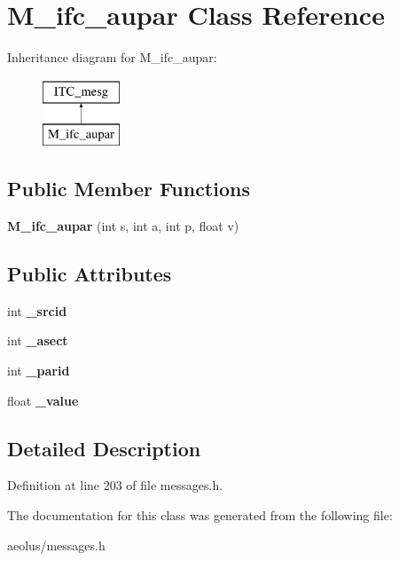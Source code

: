 \hypertarget{class_m__ifc__aupar}{}\section{M\+\_\+ifc\+\_\+aupar Class Reference}
\label{class_m__ifc__aupar}
Inheritance diagram for M\+\_\+ifc\+\_\+aupar\+:\begin{figure}[H]
\begin{center}
\leavevmode
\includegraphics[height=2.000000cm]{class_m__ifc__aupar}
\end{center}
\end{figure}
\subsection*{Public Member Functions}
\begin{DoxyCompactItemize}
\item 
\mbox{\label{class_m__ifc__aupar_a8bdf56df27f1d9e9916a562db3147278}} 
{\bfseries M\+\_\+ifc\+\_\+aupar} (int s, int a, int p, float v)
\end{DoxyCompactItemize}
\subsection*{Public Attributes}
\begin{DoxyCompactItemize}
\item 
\mbox{\label{class_m__ifc__aupar_a7a3bec9bad6c81938f8d30cda5d72027}} 
int {\bfseries \+\_\+srcid}
\item 
\mbox{\label{class_m__ifc__aupar_a47a47b8403dde7f4e25ec61b551c0f3b}} 
int {\bfseries \+\_\+asect}
\item 
\mbox{\label{class_m__ifc__aupar_a5a560f312099018c1376b7d6d5501cd0}} 
int {\bfseries \+\_\+parid}
\item 
\mbox{\label{class_m__ifc__aupar_aea3bd2fc71e12a15aa653b704f9983b1}} 
float {\bfseries \+\_\+value}
\end{DoxyCompactItemize}


\subsection{Detailed Description}


Definition at line 203 of file messages.\+h.



The documentation for this class was generated from the following file\+:\begin{DoxyCompactItemize}
\item 
aeolus/messages.\+h\end{DoxyCompactItemize}
